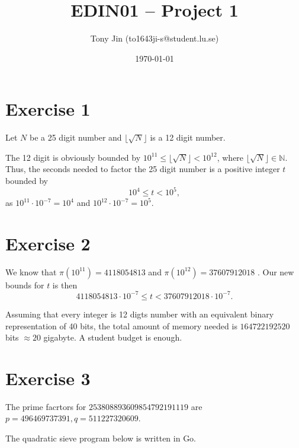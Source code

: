 \documentclass{article}
\newcommand{\floor}[1]{\lfloor #1 \rfloor}
\theoremstyle{definition}
\theoremstyle{definition}
\theoremstyle{definition}
\begin{document}
\title{EDIN01 -- Project 1}
\author{Tony Jin (to1643ji-s@student.lu.se)}
\date{\today}
\maketitle


\section{Exercise 1}
Let $N$ be a 25 digit number and $\lfloor \sqrt{N} \rfloor$ is a 12 digit number.

The 12 digit is obviously bounded by $10^{11} \leq \floor{\sqrt{N}} < 10^{12}$, where $\floor{\sqrt{N}} \in \mathbb{N}$.
Thus, the seconds needed to factor the 25 digit number is a positive integer $t$ bounded by $$10^{4} \leq t < 10^{5},$$ as $10^{11} \cdot 10^{-7} = 10^{4}$ and $10^{12} \cdot 10^{-7} = 10^{5}$.

\section{Exercise 2}
We know that $\pi(10^{11}) = 4118054813$ and $\pi(10^{12}) = 37607912018$ \cite{prime}. Our new bounds for $t$ is then $$4118054813\cdot 10^{-7} \leq t < 37607912018\cdot 10^{-7}.$$

Assuming that every integer is 12 digts number with an equivalent binary representation of 40 bits, the total amount of memory needed is $164722192520$ bits $\approx 20$ gigabyte. A student budget is enough.

\section{Exercise 3}
The prime facrtors for $253808893609854792191119$ are $p = 496469737391, q = 511227320609$.

The quadratic sieve program below is written in Go.
\end{document}
